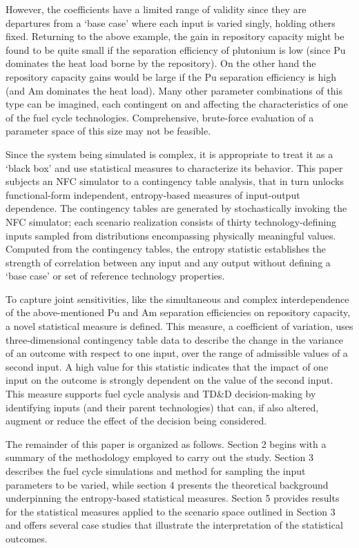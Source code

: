 However, the coefficients have a limited range of validity since they are departures from a
`base case' where each input is varied singly, holding others fixed.  Returning to the above example,
the gain in repository capacity might be found to be quite small if the separation efficiency
of plutonium is low (since Pu dominates the heat load borne by the repository). 
On the other hand the repository capacity gains would be large
if the Pu separation efficiency is high (and Am dominates the heat load).  Many other
parameter combinations of this type can be imagined, each contingent on and affecting 
the characteristics of one of the fuel cycle technologies.  Comprehensive,
brute-force evaluation of a parameter space of this size may not be feasible.

Since the system being simulated is complex, it is appropriate to treat it as a `black box'
and use statistical measures to characterize its behavior.  This paper subjects an NFC simulator
to a contingency table analysis, that in turn unlocks functional-form independent, entropy-based
measures of input-output dependence.  The contingency tables are generated by stochastically invoking
the NFC simulator; each scenario realization consists of thirty technology-defining inputs sampled
from distributions encompassing physically meaningful values.  Computed from the contingency tables,
the entropy statistic establishes the strength of correlation between any input and any output
without defining a `base case' or set of reference technology properties.

To capture joint sensitivities, like the simultaneous and complex interdependence of the
above-mentioned Pu and Am separation efficiencies on repository capacity, a novel statistical
measure is defined.  This measure, a coefficient of variation, uses three-dimensional contingency
table data to describe the change in the variance of an outcome with respect to one input, over the
range of admissible values of a second input.  A high value for this statistic indicates that the
impact of one input on the outcome is strongly dependent on the value of the second input.  This
measure supports fuel cycle analysis and TD\&D decision-making by identifying inputs (and their
parent technologies) that can, if also altered, augment or reduce the effect of the decision
being considered.

The remainder of this paper is organized as follows.  Section 2 begins with a summary of the
methodology employed to carry out the study.  Section 3 describes the fuel cycle simulations and 
method for sampling the input parameters to be varied, while section 4 presents the theoretical 
background underpinning the entropy-based
statistical measures.  Section 5 provides results for the statistical measures applied to the scenario
space outlined in Section 3 and offers several case studies that illustrate the interpretation
of the statistical outcomes.

